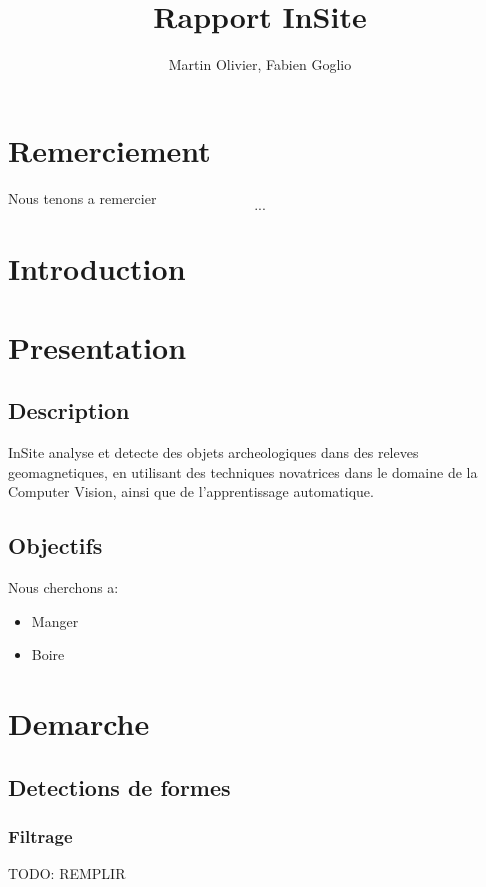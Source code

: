 \documentclass[a4paper, 12pt, titlepage, oneside]{article}
\author{Martin Olivier, Fabien Goglio}
\title{Rapport InSite}
\begin{document}
\maketitle

\newpage
	\tableofcontents
\newpage
\cleardoublepage
{}
\section{Remerciement}
	Nous tenons a remercier \[...\]
	\newpage
\section{Introduction}
	\newpage
\section{Presentation}
	\subsection{Description}
		InSite analyse et detecte des objets archeologiques dans des releves geomagnetiques, en utilisant des techniques novatrices dans le domaine de
		la Computer Vision, ainsi que de l'apprentissage automatique.
	\subsection{Objectifs}
	Nous cherchons a:
	\begin{itemize}
		\item Manger 
		\item Boire
	\end{itemize}

	\newpage
\section{Demarche}
	\subsection{Detections de formes}

	\subsubsection{Filtrage}
	{TODO: REMPLIR}
	
\end{document}
